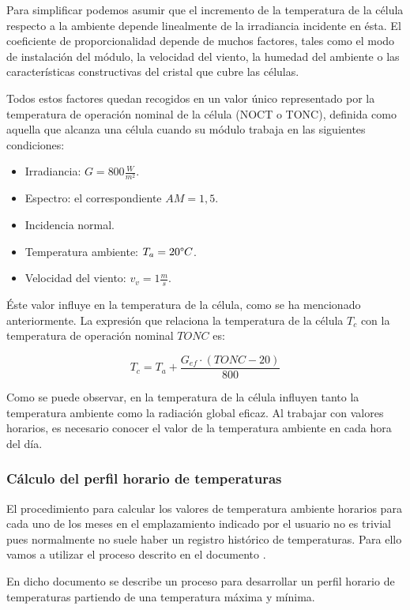 Para simplificar podemos asumir que el incremento de la temperatura de la célula respecto a la ambiente depende linealmente de la irradiancia incidente en ésta. El coeficiente de proporcionalidad depende de muchos factores, tales como el modo de instalación del módulo, la velocidad del viento, la humedad del ambiente o las características constructivas del cristal que cubre las células.

Todos estos factores quedan recogidos en un valor único representado por la temperatura de operación nominal de la célula (NOCT o TONC), definida como aquella que alcanza una célula cuando su módulo trabaja en las siguientes condiciones:
\begin{itemize}
\item Irradiancia: $G=800 \frac{W}{m^2}$.
\item Espectro: el correspondiente $AM=1,5$.
\item Incidencia normal.
\item Temperatura ambiente: $T_a = 20 \degree C$.
\item Velocidad del viento:  $ v_v = 1 \frac{m}{s}$.
\end{itemize}

Éste valor influye en la temperatura de la célula, como se ha mencionado anteriormente. La expresión que relaciona la temperatura de la célula $T_c$ con la temperatura de operación nominal $TONC$ es:

\begin{equation}
\label{eqn:T_c}
T_c = T_a + \frac{G_{ef}\cdot(TONC - 20)}{800}
\end{equation}

Como se puede observar, en la temperatura de la célula influyen tanto la temperatura ambiente como la radiación global eficaz. Al trabajar con valores horarios, es necesario conocer el valor de la temperatura ambiente en cada hora del día.

\subsubsection{Cálculo del perfil horario de temperaturas}

El procedimiento para calcular los valores de temperatura ambiente horarios para cada uno de los meses en el emplazamiento indicado por el usuario no es trivial pues normalmente no suele haber un registro histórico de temperaturas. Para ello vamos a utilizar el proceso descrito en el documento \cite{temp_paper}.

En dicho documento se describe un proceso para desarrollar un perfil horario de temperaturas partiendo de una temperatura máxima y mínima.

